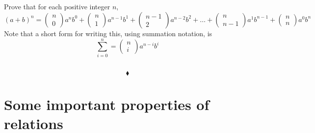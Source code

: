 \subsection{}
\begin{tcolorbox}
Prove that for each positive integer $n$, 
$$(a + b)^n =\left(\begin{matrix}n\\ 0\end{matrix}\right)a^{n}b^{0}+\left(\begin{matrix}n\\ 1\end{matrix}\right)a^{n-1}b^{1}+\left(\begin{matrix}n-1\\ 2\end{matrix}\right)a^{n-2}b^{2}+\dots +\left(\begin{matrix}n\\n-1\end{matrix}\right)a^{1}b^{n-1}+\left(\begin{matrix}n\\ n\end{matrix}\right)a^{0}b^{n}$$ Note  that a short form for writing this, using summation notation, is $$\sum^n_{i=0} = \left(\begin{matrix}n\\ i\end{matrix}\right)a^{n-i}b^i$$
\end{tcolorbox}
$$ $$

$$\blacklozenge$$

\newpage

 \section{Some important properties of relations}
